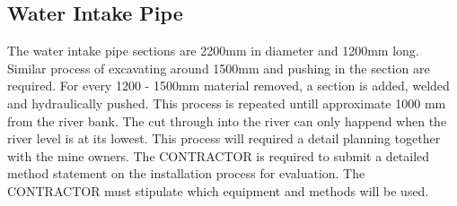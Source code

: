 \documentclass{article}%
\begin{document}
%
\subsection{Water Intake Pipe}%
\label{subsec:WaterIntakePipe}%
The water intake pipe sections are 2200mm in diameter and 1200mm long. Similar process of excavating around 1500mm and pushing in the section are required. For every 1200 - 1500mm material removed, a section is added, welded and hydraulically pushed. This process is repeated untill approximate 1000 mm from the river bank.%
\newline%
%
\newline%
%
The cut through into the river can only happend when the river level is at its lowest. This process will required a detail planning together with the mine owners.%
\newline%
%
\newline%
%
The CONTRACTOR is required to submit a detailed method statement on the installation process for evaluation. The CONTRACTOR must stipulate which equipment and methods will be used.

%
\newpage

%
\end{document}
